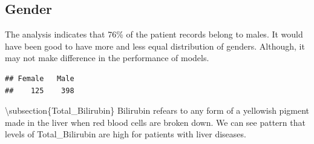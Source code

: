 \documentclass[]{article}
\newenvironment{Shaded}{\begin{snugshade}}{\end{snugshade}}
\newcommand{\CommentTok}[1]{\textcolor[rgb]{0.56,0.35,0.01}{\textit{#1}}}
\newcommand{\DataTypeTok}[1]{\textcolor[rgb]{0.13,0.29,0.53}{#1}}
\newcommand{\KeywordTok}[1]{\textcolor[rgb]{0.13,0.29,0.53}{\textbf{#1}}}
\newcommand{\NormalTok}[1]{#1}
\newcommand{\OperatorTok}[1]{\textcolor[rgb]{0.81,0.36,0.00}{\textbf{#1}}}
\newcommand{\StringTok}[1]{\textcolor[rgb]{0.31,0.60,0.02}{#1}}
\begin{document}
\subsection{Gender}

The analysis indicates that 76\% of the patient records belong to males.
It would have been good to have more and less equal distribution of
genders. Although, it may not make difference in the performance of
models.

\begin{Shaded}
\end{Shaded}

\begin{verbatim}
## Female   Male 
##    125    398
\end{verbatim}

\textbackslash subsection\{Total\_Bilirubin\} Bilirubin refears to any
form of a yellowish pigment made in the liver when red blood cells are
broken down. We can see pattern that levels of Total\_Bilirubin are high
for patients with liver diseases.

\begin{Shaded}
\end{Shaded}
\end{document}
